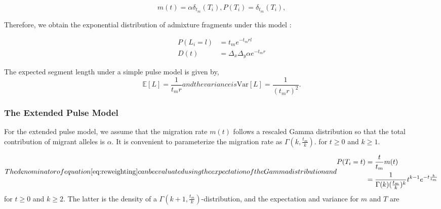 \documentclass[11pt]{article}
\begin{document}
\begin{subequations}
\begin{equation}
\label{eq:RV_simple_pulse}
	m(t)=  \alpha \delta_{t_m}(T_i),
\end{equation} 
	
\begin{equation}
\label{eq:RV_simple_pulse}
	P(T_i)=\delta_{t_m}(T_i),
\end{equation} 
\end{subequations}


	
Therefore, we obtain the exponential distribution of admixture fragments under this model \citep[e.g.][]{moorjani_history_2011}:

\begin{subequations}
\begin{align}
\label{eq:Likelihood_function_simple_pulse}
	P(L_i=l) &= t_me^{-t_m r l}\\
	D(t) &= \Delta_x\Delta_y \alpha e^{-t_m r}
\end{align}
\end{subequations}	

The expected segment length under a simple pulse model is given by,
\begin{subequations}

\begin{equation}
\label{eq:Expected_l_simple_pulse}
\mathbb{E}[L]=\frac{1}{t_m r}
\end{equation}
	
and the variance is
\begin{equation}
\label{eq:Expected_v_simple_pulse}
\text{Var}[L]=\frac{1}{(t_m r)^2} \text{.}
\end{equation}
\end{subequations}	

\subsubsection{The Extended Pulse Model}\label{The Extended Pulse Model}
	
For the extended pulse model, we assume that the migration rate $m(t)$ follows a rescaled Gamma distribution so that the total contribution of migrant alleles is $\alpha$.  It is convenient to parameterize the migration rate as $\Gamma(k,\frac{t_m}{k})$.
for $t \geq 0$ and $k \geq 1$. 

\begin{subequations}
The denominator of equation \ref{eq:reweighting} can be evaluated using the expectation of the Gamma distribution and

\begin{align}
\label{eq:Gamma_density}
    P(T_i=t) &= \frac{t}{t_m}m(t)\\
        &=\frac{1}{\Gamma(k)(\frac{t_m}{k})^k}t^{k-1}e^{-t\frac{k}{t_m}} 
\end{align}
\end{subequations}
for $t \geq 0$ and $k \geq 2$. The latter is the density of a $\Gamma(k+1, \frac{t_m}{k})$-distribution, and the expectation and variance for $m$ and $T$ are 
	
\end{document}
